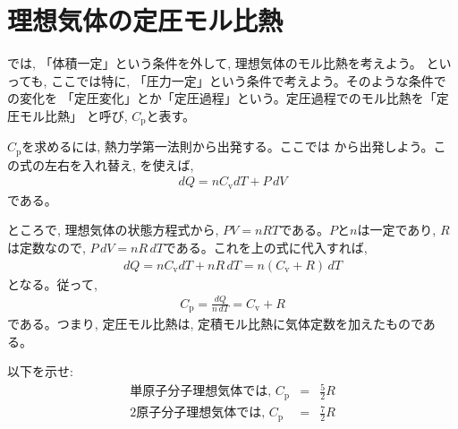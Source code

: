 \section{理想気体の定圧モル比熱}

では, 「体積一定」という条件を外して, 理想気体のモル比熱を考えよう。
といっても, ここでは特に, 「圧力一定」という条件で考えよう。そのような条件での変化を
「定圧変化」とか「定圧過程」という。定圧過程でのモル比熱を「定圧モル比熱」
と呼び, $C_{\text{p}}$と表す。

$C_{\text{p}}$を求めるには, 熱力学第一法則から出発する。ここでは
から出発しよう。この式の左右を入れ替え, 
を使えば, 
\begin{eqnarray}
dQ=nC_{\text{v}}dT+P\,dV
\end{eqnarray}
である。

ところで, 理想気体の状態方程式から, $PV=nRT$である。$P$と$n$は一定であり, 
$R$は定数なので, $P\,dV=nR\,dT$である。これを上の式に代入すれば, 
\begin{eqnarray}
dQ=nC_{\text{v}}dT+nR\,dT=n(C_{\text{v}}+R)\,dT
\end{eqnarray}
となる。従って, 
\begin{eqnarray}
C_{\text{p}}=\frac{dQ}{n\,dT}=C_{\text{v}}+R
\end{eqnarray}
である。つまり, 定圧モル比熱は, 定積モル比熱に気体定数を加えたものである。

\begin{q} 以下を示せ:
\begin{eqnarray}
\text{単原子分子理想気体では, }C_{\text{p}}&=&\frac{5}{2}R\label{eq:Cp_monomol}\\
\text{2原子分子理想気体では, }C_{\text{p}}&=&\frac{7}{2}R\label{eq:Cp_2mol}
\end{eqnarray}
\end{q}

